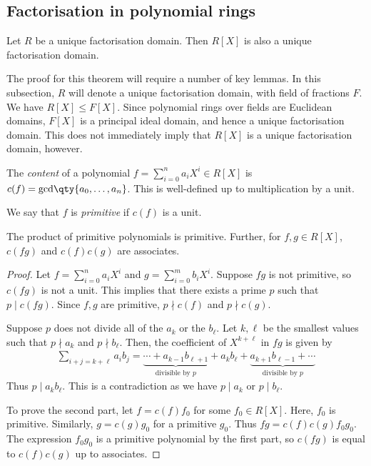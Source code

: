 \subsection{Factorisation in polynomial rings}
\begin{theorem}
	Let $R$ be a unique factorisation domain.
	Then $R[X]$ is also a unique factorisation domain.
\end{theorem}
The proof for this theorem will require a number of key lemmas.
In this subsection, $R$ will denote a unique factorisation domain, with field of fractions $F$.
We have $R[X] \leq F[X]$.
Since polynomial rings over fields are Euclidean domains, $F[X]$ is a principal ideal domain, and hence a unique factorisation domain.
This does not immediately imply that $R[X]$ is a unique factorisation domain, however.
\begin{definition}
	The \textit{content} of a polynomial $f = \sum_{i=0}^n a_i X^i \in R[X]$ is $c(f) = \mathrm{gcd}\qty{a_0, \dots, a_n}$.
	This is well-defined up to multiplication by a unit.

	We say that $f$ is \textit{primitive} if $c(f)$ is a unit.
\end{definition}
\begin{lemma}
	The product of primitive polynomials is primitive.
	Further, for $f, g \in R[X]$, $c(fg)$ and $c(f)c(g)$ are associates.
\end{lemma}
\begin{proof}
	Let $f = \sum_{i=0}^n a_i X^i$ and $g = \sum_{i=0}^m b_i X^i$.
	Suppose $fg$ is not primitive, so $c(fg)$ is not a unit.
	This implies that there exists a prime $p$ such that $p \mid c(fg)$.
	Since $f, g$ are primitive, $p \nmid c(f)$ and $p \nmid c(g)$.

	Suppose $p$ does not divide all of the $a_k$ or the $b_\ell$.
	Let $k, \ell$ be the smallest values such that $p \nmid a_k$ and $p \nmid b_\ell$.
	Then, the coefficient of $X^{k+\ell}$ in $fg$ is given by
	\begin{align*}
		\sum_{i+j=k+\ell} a_i b_j = \underbrace{\cdots + a_{k-1} b_{\ell+1}}_{\text{divisible by } p} + a_k b_\ell + \underbrace{a_{k+1} b_{\ell - 1} + \cdots}_{\text{divisible by } p}
	\end{align*}
	Thus $p \mid a_k b_\ell$.
	This is a contradiction as we have $p \mid a_k$ or $p \mid b_\ell$.

	To prove the second part, let $f = c(f) f_0$ for some $f_0 \in R[X]$.
	Here, $f_0$ is primitive.
	Similarly, $g = c(g) g_0$ for a primitive $g_0$.
	Thus $fg = c(f) c(g) f_0 g_0$.
	The expression $f_0 g_0$ is a primitive polynomial by the first part, so $c(fg)$ is equal to $c(f) c(g)$ up to associates.
\end{proof}
